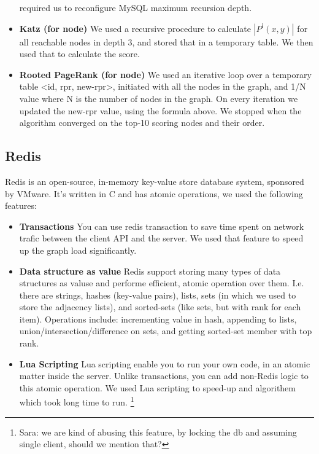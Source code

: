 \begin{itemize}
		required us to reconfigure MySQL maximum recursion depth.
	\item {\bf Katz (for node)}
		We used a recursive procedure to calculate $|P^l(x,y)|$ for all reachable nodes in depth 3,
		and stored that in a temporary table. We then used that to calculate the score.
	\item {\bf Rooted PageRank (for node)}
        We used an iterative loop over a temporary table <id, rpr, new-rpr>, initiated with all the 
        nodes in the graph, and 1/N value where N is the number of nodes in the graph. On every 
        iteration we updated the new-rpr value, using the formula above. We stopped when the algorithm
        converged on the top-10 scoring nodes and their order.
\end{itemize}

\subsection{Redis}
Redis is an open-source, in-memory key-value store database system, sponsored
by VMware. It's written in C and has atomic operations, we used the following features:
\begin{itemize}
	\item {\bf Transactions}
        You can use redis transaction to save time spent on network trafic 
        between the client API and the server. We used that feature to speed up
        the graph load significantly.
	\item {\bf Data structure as value}
        Redis support storing many types of data structures as valuse and 
        performe efficient, atomic operation over them. I.e. there are strings,
        hashes (key-value pairs), lists, sets (in which we used to store the 
        adjacency lists), and sorted-sets (like sets, but with rank for each item).
        Operations include: incrementing value in hash, appending to lists, 
        union/intersection/difference on sets, and getting sorted-set member with top rank.
	\item {\bf Lua Scripting}
        Lua scripting enable you to run your own code, in an atomic matter inside the server.
        Unlike transactions, you can add non-Redis logic to this atomic operation. We used 
        Lua scripting to speed-up and algorithem which took long time to run. \footnote{Sara: 
        we are kind of abusing this feature, by locking the db and assuming single client, 
        should we mention that?}
\end{itemize}

